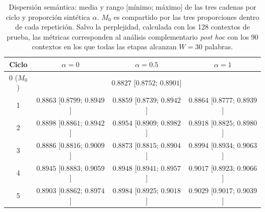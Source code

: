 
\begin{table}[ht]
\centering
\footnotesize
\begin{tabular}{c c c c}
\hline
Ciclo & $\alpha=0$ & $\alpha=0.5$ & $\alpha=1$ \\
\hline
0 ($M_0$) & \multicolumn{3}{c}{$0.8827$ [$0.8752$; $0.8901$]} \\
1 & $0.8863$ [$0.8799$; $0.8949$] & $0.8859$ [$0.8739$; $0.8942$] & $0.8864$ [$0.8777$; $0.8939$] \\
2 & $0.8898$ [$0.8861$; $0.8942$] & $0.8954$ [$0.8909$; $0.8982$] & $0.8918$ [$0.8825$; $0.8980$] \\
3 & $0.8886$ [$0.8816$; $0.9009$] & $0.8873$ [$0.8815$; $0.8904$] & $0.8994$ [$0.8934$; $0.9063$] \\
4 & $0.8945$ [$0.8883$; $0.9059$] & $0.8948$ [$0.8941$; $0.8957$] & $0.9017$ [$0.8923$; $0.9066$] \\
5 & $0.8903$ [$0.8862$; $0.8974$] & $0.8984$ [$0.8925$; $0.9018$] & $0.9029$ [$0.9017$; $0.9039$] \\
\hline
\end{tabular}
\caption{Dispersión semántica: media y rango [mínimo; máximo] de las tres cadenas por ciclo y proporción sintética $\alpha$. $M_0$ es compartido por las tres proporciones dentro de cada repetición. Salvo la perplejidad, calculada con los 128 contextos de prueba, las métricas corresponden al análisis complementario \textit{post hoc} con los 90 contextos en los que todas las etapas alcanzan $W=30$ palabras.}
\label{tab:medias_semantic_dispersion}
\end{table}
